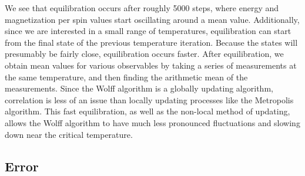 \documentclass[twocolumn,aps]{revtex4-1} %
\begin{document}
We see that equilibration occurs after roughly 5000 steps, where energy and magnetization per spin values start oscillating around a mean value. Additionally, since we are interested in a small range of temperatures, equilibration can start from the final state of the previous temperature iteration. Because the states will presumably be fairly close, equilibration occurs faster. After equilibration, we obtain mean values for various observables by taking a series of measurements at the same temperature, and then finding the arithmetic mean of the measurements. Since the Wolff algorithm is a globally updating algorithm, correlation is less of an issue than locally updating processes like the Metropolis algorithm. This fast equilibration, as well as the non-local method of updating, allows the Wolff algorithm to have much less pronounced fluctuations and slowing down near the critical temperature. 

\subsection{Error}
\end{document}
